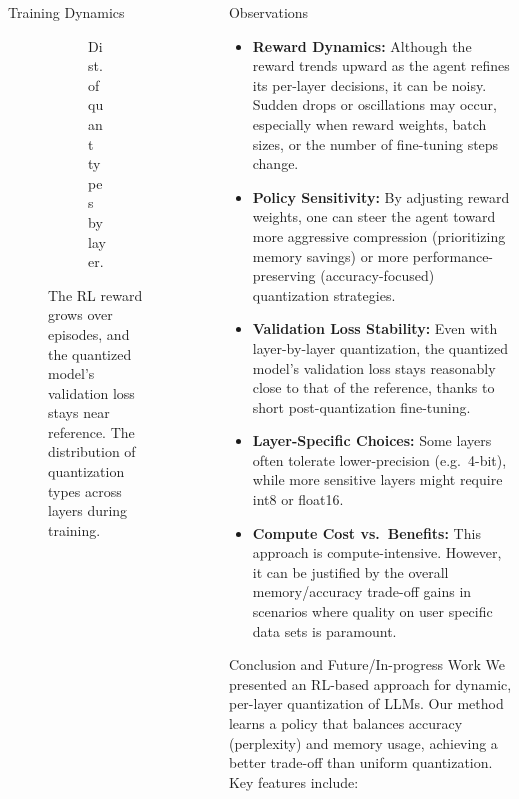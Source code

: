 \documentclass[final]{beamer}
\newlength{\sepwidth}
\newlength{\colwidth}
\newcommand{\separatorcolumn}{\begin{column}{\sepwidth}\end{column}}
\begin{document}
\begin{frame}[t]
\begin{columns}[t]
\begin{column}{\colwidth}
\begin{block}{Training Dynamics}
\begin{figure}[ht]
\begin{subfigure}[b]{0.3\linewidth}
							\caption{\small Dist. of quant types by layer.}
							\label{subfig:reward_trend}
						\end{subfigure}
						
						\caption{\small The RL reward grows over episodes, and the quantized model’s validation loss stays near reference. The distribution of quantization types across layers during training.}
						\label{fig:training_plots}
					\end{figure}					
				\end{block}
				
			\end{column}
			
			\separatorcolumn
			
			\begin{column}{\colwidth}
				
				\begin{block}{Observations}
					\begin{itemize}
						\item \textbf{Reward Dynamics:} Although the reward trends upward as the agent refines its per-layer decisions, it can be noisy. Sudden drops or oscillations may occur, especially when reward weights, batch sizes, or the number of fine-tuning steps change.
						\item \textbf{Policy Sensitivity:} By adjusting reward weights, one can steer the agent toward more aggressive compression (prioritizing memory savings) or more performance-preserving (accuracy-focused) quantization strategies.
						\item \textbf{Validation Loss Stability:} Even with layer-by-layer quantization, the quantized model's validation loss stays reasonably close to that of the reference, thanks to short post-quantization fine-tuning.
						\item \textbf{Layer-Specific Choices:} Some layers often tolerate lower-precision (e.g.\ 4-bit), while more sensitive layers might require int8 or float16.
						\item \textbf{Compute Cost vs.\ Benefits:} This approach is compute-intensive. However, it can be justified by the overall memory/accuracy trade-off gains in scenarios where quality on user specific data sets is paramount.
					\end{itemize}
				\end{block}
				
				
				
				\begin{block}{Conclusion and Future/In-progress Work}
					We presented an RL-based approach for dynamic, per-layer quantization of LLMs.  Our method learns a policy that balances accuracy (perplexity) and memory usage, achieving a better trade-off than uniform quantization.  Key features include:
					

\end{block}
\end{column}
\end{columns}
\end{frame}
\end{document}
